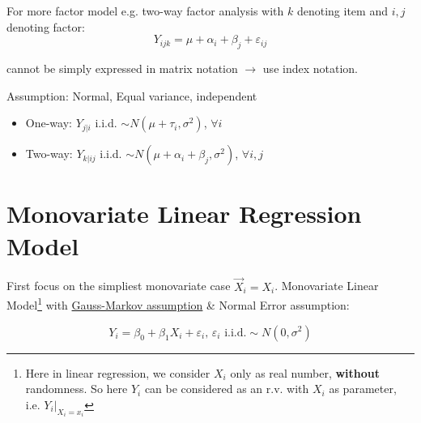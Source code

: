     For more factor model e.g. two-way factor analysis with $ k $ denoting item and $ i,j $ denoting factor:
    \begin{equation}
         Y_{ijk}=\mu +\alpha _i+\beta _j+\varepsilon  _{ij}
    \end{equation}

    cannot be simply expressed in matrix notation $ \longrightarrow $ use index notation.

    Assumption: Normal, Equal variance, independent
\begin{itemize}[topsep=2pt,itemsep=0pt]
    \item One-way: $ Y_{j|i} $ i.i.d. $ \sim N(\mu+\tau_i,\sigma ^2) $, $ \forall i $
    \item Two-way: $ Y_{k|ij} $ i.i.d. $ \sim N(\mu +\alpha _i+\beta _j,\sigma ^2) $, $ \forall i,j $
\end{itemize}

    
    
    


























\section{Monovariate Linear Regression Model}
    First focus on the simpliest monovariate case $ \vec{X}_i=X_i $. Monovariate Linear Model\footnote{Here in linear regression, we consider $ X_i $ only as real number, \textbf{without} randomness. So here $ Y_i $ can be considered as an r.v. with $ X_i $ as parameter, i.e. $ Y_i|_{X_i=x_i} $}
    with \hyperlink{GaussMarkovAssumption}{Gauss-Markov assumption} \& Normal Error assumption:
    
    \begin{equation}
        Y_i=\beta _0+\beta _1X_i+\varepsilon _i ,\, \varepsilon _i\text{ i.i.d.}\sim N(0,\sigma ^2) 
    \end{equation}


